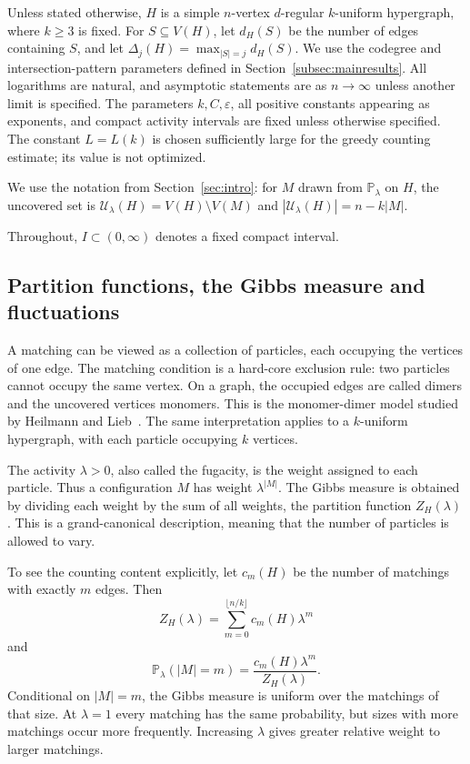 \documentclass[11pt,reqno]{amsart}
\numberwithin{equation}{section}
\theoremstyle{plain}
\theoremstyle{definition}
\newcommand{\Prob}{\mathbb P}
\newcommand{\eps}{\varepsilon}
\newcommand{\calU}{\mathcal U}
\begin{document}
Unless stated otherwise, $H$ is a simple $n$-vertex $d$-regular $k$-uniform hypergraph, where $k\ge3$ is fixed.
For $S\subseteq V(H)$, let $d_H(S)$ be the number of edges containing $S$, and let $\Delta_j(H)=\max_{|S|=j}d_H(S)$.
We use the codegree and intersection-pattern parameters defined in Section~\ref{subsec:mainresults}.
All logarithms are natural, and asymptotic statements are as $n\to\infty$ unless another limit is specified.
The parameters $k,C,\eps$, all positive constants appearing as exponents, and compact activity intervals are fixed unless otherwise specified.
The constant $L=L(k)$ is chosen sufficiently large for the greedy counting estimate; its value is not optimized.

We use the notation from Section~\ref{sec:intro}: for $M$ drawn from $\Prob_\lambda$ on $H$, the uncovered set is $\calU_\lambda(H)=V(H)\setminus V(M)$ and $|\calU_\lambda(H)|=n-k|M|$.

Throughout, $I\subset(0,\infty)$ denotes a fixed compact interval.


\subsection{Partition functions, the Gibbs measure and fluctuations}\label{subsec:physics}

A matching can be viewed as a collection of particles, each occupying the vertices of one edge.
The matching condition is a hard-core exclusion rule: two particles cannot occupy the same vertex.
On a graph, the occupied edges are called dimers and the uncovered vertices monomers.
This is the monomer-dimer model studied by Heilmann and Lieb~\cite{HL}.
The same interpretation applies to a $k$-uniform hypergraph, with each particle occupying $k$ vertices.

The activity $\lambda>0$, also called the fugacity, is the weight assigned to each particle.
Thus a configuration $M$ has weight $\lambda^{|M|}$.
The Gibbs measure is obtained by dividing each weight by the sum of all weights, the partition function $Z_H(\lambda)$.
This is a grand-canonical description, meaning that the number of particles is allowed to vary.

To see the counting content explicitly, let $c_m(H)$ be the number of matchings with exactly $m$ edges.
Then
\begin{equation*}
    Z_H(\lambda)=\sum_{m=0}^{\lfloor n/k\rfloor}c_m(H)\lambda^m
\end{equation*}
and
\begin{equation*}
    \Prob_\lambda(|M|=m)=\frac{c_m(H)\lambda^m}{Z_H(\lambda)}.
\end{equation*}
Conditional on $|M|=m$, the Gibbs measure is uniform over the matchings of that size.
At $\lambda=1$ every matching has the same probability, but sizes with more matchings occur more frequently.
Increasing $\lambda$ gives greater relative weight to larger matchings.
\end{document}
